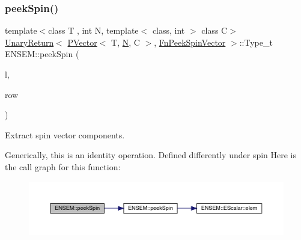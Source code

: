 \subsubsection{\texorpdfstring{peekSpin()}{peekSpin()}\hspace{0.1cm}{\footnotesize\ttfamily [1/2]}}
{\footnotesize\ttfamily template$<$class T , int N, template$<$ class, int $>$ class C$>$ \\
\mbox{\hyperlink{structENSEM_1_1UnaryReturn}{Unary\+Return}}$<$ \mbox{\hyperlink{classENSEM_1_1PVector}{P\+Vector}}$<$ T, \mbox{\hyperlink{operator__name__util_8cc_a7722c8ecbb62d99aee7ce68b1752f337}{N}}, C $>$, \mbox{\hyperlink{structENSEM_1_1FnPeekSpinVector}{Fn\+Peek\+Spin\+Vector}} $>$\+::Type\+\_\+t E\+N\+S\+E\+M\+::peek\+Spin (\begin{DoxyParamCaption}\item[{const \mbox{\hyperlink{classENSEM_1_1PVector}{P\+Vector}}$<$ T, \mbox{\hyperlink{operator__name__util_8cc_a7722c8ecbb62d99aee7ce68b1752f337}{N}}, C $>$ \&}]{l,  }\item[{int}]{row }\end{DoxyParamCaption})\hspace{0.3cm}{\ttfamily [inline]}}



Extract spin vector components. 

Generically, this is an identity operation. Defined differently under spin Here is the call graph for this function\+:\nopagebreak
\begin{figure}[H]
\begin{center}
\leavevmode
\includegraphics[width=350pt]{d3/dc4/group__primvector_ga4da125100d39a8e268564ed66d48bae5_cgraph}
\end{center}
\end{figure}
\mbox{\label{group__primvector_ga5461f8956839af7e7079b717601376a7}} 
